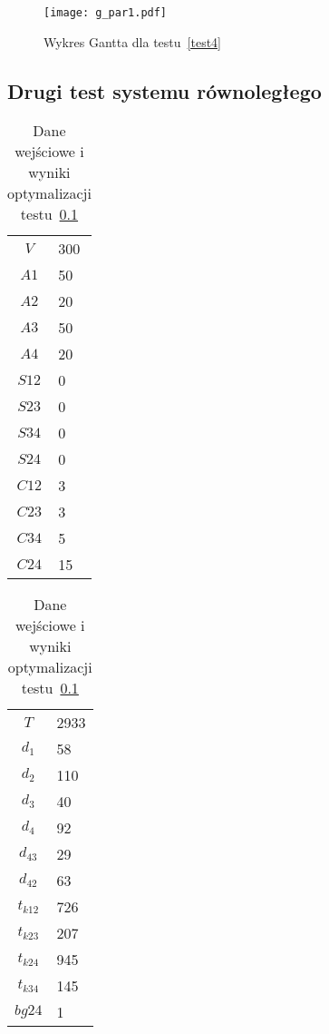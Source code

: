 \begin{figure}[H]
\centering
\texttt{[image: g\_par1.pdf]}
\caption{Wykres Gantta dla testu~\ref{test4}}
\label{fig:res_4b}
\end{figure}

\subsection{Drugi test systemu równoległego} \label{test5}

\begin{table}[H]
\begin{minipage}[b]{0.5\linewidth}
\centering
\begin{tabular}{c l}
$V$ & 300 \\
$A1$ & 50 \\
$A2$ & 20 \\
$A3$ & 50 \\
$A4$ & 20 \\
$S12$ & 0 \\
$S23$ & 0 \\
$S34$ & 0 \\
$S24$ & 0 \\
$C12$ & 3 \\
$C23$ & 3 \\
$C34$ & 5 \\
$C24$ & 15 \\
\end{tabular}
\end{minipage}
\hspace{0.5cm}
\begin{minipage}[b]{0.5\linewidth}
\centering
\begin{tabular}{c l}
$T$ & 2933 \\
$d_{1}$ & 58 \\
$d_{2}$ & 110 \\
$d_{3}$ & 40 \\
$d_{4}$ & 92 \\
$d_{43}$ & 29 \\
$d_{42}$ & 63 \\
$t_{k12}$ & 726 \\
$t_{k23}$ & 207 \\
$t_{k24}$ & 945 \\
$t_{k34}$ & 145 \\
$bg24$ & 1 \\
\end{tabular}
\end{minipage}
\caption{Dane wejściowe i wyniki optymalizacji testu~\ref{test5}}
\label{tab:res_5a}
\end{table}

\newpage
